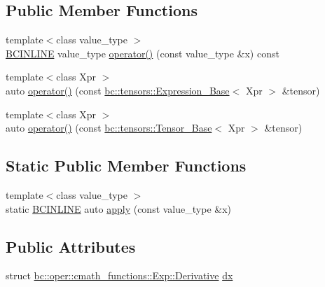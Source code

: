 \subsection*{Public Member Functions}
\begin{DoxyCompactItemize}
\item 
{\footnotesize template$<$class value\+\_\+type $>$ }\\\hyperlink{common_8h_a6699e8b0449da5c0fafb878e59c1d4b1}{B\+C\+I\+N\+L\+I\+NE} value\+\_\+type \hyperlink{structbc_1_1oper_1_1cmath__functions_1_1Exp_a5df0815aae9d0b9185d3a54b2915f848}{operator()} (const value\+\_\+type \&x) const
\item 
{\footnotesize template$<$class Xpr $>$ }\\auto \hyperlink{structbc_1_1oper_1_1cmath__functions_1_1Exp_a9570cb79f760e9422dfff9c6c4bd01e1}{operator()} (const \hyperlink{classbc_1_1tensors_1_1Expression__Base}{bc\+::tensors\+::\+Expression\+\_\+\+Base}$<$ Xpr $>$ \&tensor)
\item 
{\footnotesize template$<$class Xpr $>$ }\\auto \hyperlink{structbc_1_1oper_1_1cmath__functions_1_1Exp_adfe01648f4169859035259f89e5d5286}{operator()} (const \hyperlink{classbc_1_1tensors_1_1Tensor__Base}{bc\+::tensors\+::\+Tensor\+\_\+\+Base}$<$ Xpr $>$ \&tensor)
\end{DoxyCompactItemize}
\subsection*{Static Public Member Functions}
\begin{DoxyCompactItemize}
\item 
{\footnotesize template$<$class value\+\_\+type $>$ }\\static \hyperlink{common_8h_a6699e8b0449da5c0fafb878e59c1d4b1}{B\+C\+I\+N\+L\+I\+NE} auto \hyperlink{structbc_1_1oper_1_1cmath__functions_1_1Exp_a327342717e1893787a1a339e85c397a7}{apply} (const value\+\_\+type \&x)
\end{DoxyCompactItemize}
\subsection*{Public Attributes}
\begin{DoxyCompactItemize}
\item 
struct \hyperlink{structbc_1_1oper_1_1cmath__functions_1_1Exp_1_1Derivative}{bc\+::oper\+::cmath\+\_\+functions\+::\+Exp\+::\+Derivative} \hyperlink{structbc_1_1oper_1_1cmath__functions_1_1Exp_aae67a1886b7fcd438ab94746e57f4b7d}{dx}
\end{DoxyCompactItemize}


